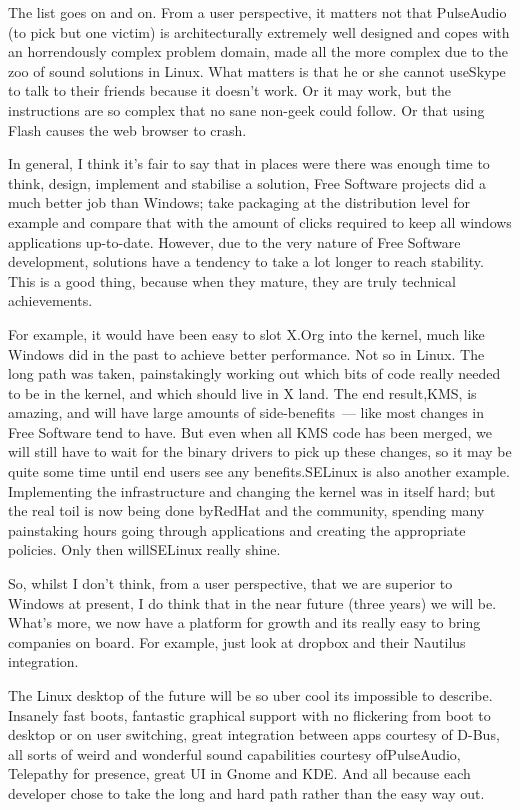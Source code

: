 \documentclass{memoir}
\begin{document}
The list goes on and on. From a user perspective, it matters not that
PulseAudio (to pick but one victim) is architecturally extremely well
designed and copes with an horrendously complex problem domain, made
all the more complex due to the zoo of sound solutions in Linux. What
matters is that he or she cannot useSkype to talk to their friends
because it doesn't work. Or it may work, but the instructions are so
complex that no sane non-geek could follow. Or that using Flash causes
the web browser to crash.

In general, I think it's fair to say that in places were there was
enough time to think, design, implement and stabilise a solution, Free
Software projects did a much better job than Windows; take packaging
at the distribution level for example and compare that with the amount
of clicks required to keep all windows applications
up-to-date. However, due to the very nature of Free Software
development, solutions have a tendency to take a lot longer to reach
stability. This is a good thing, because when they mature, they are
truly technical achievements.

For example, it would have been easy to slot X.Org into the kernel,
much like Windows did in the past to achieve better performance. Not
so in Linux. The long path was taken, painstakingly working out which
bits of code really needed to be in the kernel, and which should live
in X land. The end result,KMS, is amazing, and will have large amounts
of side-benefits~--- like most changes in Free Software tend to
have. But even when all KMS code has been merged, we will still have
to wait for the binary drivers to pick up these changes, so it may be
quite some time until end users see any benefits.SELinux is also
another example. Implementing the infrastructure and changing the
kernel was in itself hard; but the real toil is now being done
byRedHat and the community, spending many painstaking hours going
through applications and creating the appropriate policies. Only then
willSELinux really shine.

So, whilst I don't think, from a user perspective, that we are
superior to Windows at present, I do think that in the near future
(three years) we will be. What's more, we now have a platform for
growth and its really easy to bring companies on board. For example,
just look at dropbox and their Nautilus integration.

The Linux desktop of the future will be so uber cool its impossible to
describe. Insanely fast boots, fantastic graphical support with no
flickering from boot to desktop or on user switching, great
integration between apps courtesy of D-Bus, all sorts of weird and
wonderful sound capabilities courtesy ofPulseAudio, Telepathy for
presence, great UI in Gnome and KDE. And all because each developer
chose to take the long and hard path rather than the easy way out.
\end{document}

